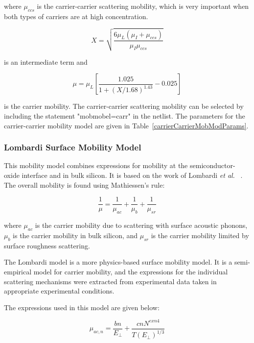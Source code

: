 where $\mu_{ccs}$ is the carrier-carrier scattering mobility, which is very
important when both types of carriers are at high concentration.

\begin{equation}
   X = \sqrt{\frac{6\mu_{L}(\mu_{I}+\mu_{ccs})}{\mu_{I}\mu_{ccs}}}
\end{equation}

is an intermediate term and

\begin{equation}
  \mu = \mu_{L}[\frac{1.025}{1+(X/1.68)^{1.43}} - 0.025]
\end{equation}

is the carrier mobility.
The carrier-carrier scattering mobility can be selected by including the
statement "mobmobel=carr" in the netlist.  The parameters for the
carrier-carrier mobility model are given in Table~\ref{carrierCarrierMobModParams}.

\newpage
{}

\subsubsection{Lombardi Surface Mobility Model}

This mobility model combines expressions for mobility at the
semiconductor-oxide interface and in bulk silicon.   It is based on the
work of Lombardi \emph{et al.} ~\cite{lombardi}. 
The overall mobility is
found using Mathiessen's rule:

\begin{equation}
   \frac{1}{\mu} = \frac{1}{\mu_{ac}} + \frac{1}{\mu_{b}} +
   \frac{1}{\mu_{sr}}
\end{equation}

where $\mu_{ac}$ is the carrier mobility due to scattering with surface
acoustic phonons, $\mu_{b}$ is the carrier mobility in bulk silicon, and
$\mu_{sr}$ is the carrier mobility limited by surface roughness scattering.

The Lombardi model is a more physics-based surface mobility model.  It is a
semi-empirical model for carrier mobility, and the expressions for the
individual scattering mechanisms were extracted from experimental data
taken in appropriate experimental conditions.

The expressions used in this model are given below:

\begin{equation}
  \mu_{ac,n} = \frac{bn}{E_{\perp}} + \frac{cn N^{exn4}}{T
  (E_{\perp})^{1/3}}
\end{equation}

